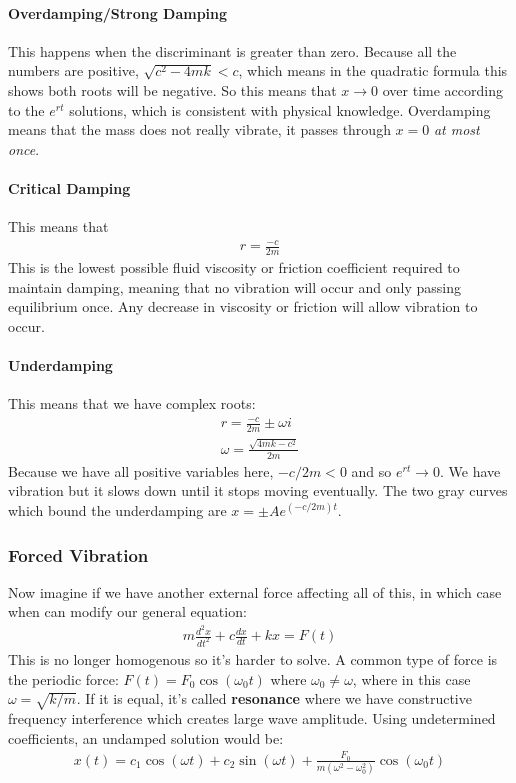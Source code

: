 \documentclass{article}
\begin{document}
\paragraph{Overdamping/Strong Damping} This happens when the discriminant is greater than zero. Because all the numbers are positive, $\sqrt{c^2 - 4mk} < c$, which means in the quadratic formula this shows both roots will be negative. So this means that $x \to 0$ over time according to the $e^{rt}$ solutions, which is consistent with physical knowledge. Overdamping means that the mass does not really vibrate, it passes through $x = 0$ \textit{at most once}.
\paragraph{Critical Damping} This means that
\begin{gather*}
    r = \frac{-c}{2m}
\end{gather*}
This is the lowest possible fluid viscosity or friction coefficient required to maintain damping, meaning that no vibration will occur and only passing equilibrium once. Any decrease in viscosity or friction will allow vibration to occur.
\paragraph{Underdamping} This means that we have complex roots:
\begin{gather*}
    r = \frac{-c}{2m} \pm \omega i\\
    \omega = \frac{\sqrt{4mk - c^2}}{2m}
\end{gather*}
Because we have all positive variables here, $-c/2m < 0$ and so $e^{rt} \to 0$. We have vibration but it slows down until it stops moving eventually. The two gray curves which bound the underdamping are $x = \pm Ae^{(-c/2m)t}$.
\subsubsection{Forced Vibration}
Now imagine if we have another external force affecting all of this, in which case when can modify our general equation:
\begin{gather*}
    m\frac{d^2x}{dt^2} + c\frac{dx}{dt} + kx = F(t)
\end{gather*}
This is no longer homogenous so it's harder to solve. A common type of force is the periodic force: $F(t) = F_0\cos(\omega_0 t)$ where $\omega_0 \neq \omega$, where in this case $\omega = \sqrt{k/m}$. If it is equal, it's called \textbf{resonance} where we have constructive frequency interference which creates large wave amplitude. Using undetermined coefficients, an undamped solution would be:
\begin{gather*}
    x(t) = c_1\cos(\omega t) + c_2\sin(\omega t) + \frac{F_0}{m(\omega^2 - \omega_0^2)}\cos(\omega_0 t)
\end{gather*}
\end{document}
